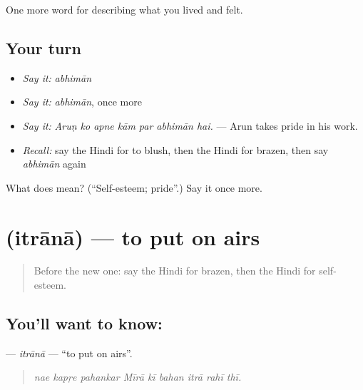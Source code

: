 \begin{grammarlens}[title={What you've built}]
One more word for describing what you lived and felt.
\end{grammarlens}

\subsection*{Your turn}
\begin{itemize}
\raggedright
  \item \emph{Say it:} \emph{abhimān}
  \item \emph{Say it:} \emph{abhimān}, once more
  \item \emph{Say it:} \emph{Aruṇ ko apne kām par abhimān hai.} — Arun takes pride in his work.
  \item \emph{Recall:} say the Hindi for to blush, then the Hindi for brazen, then say \emph{abhimān} again
\end{itemize}

\begin{tcolorbox}[breakable,colback=teal!4,colframe=teal!35!black,title={Before you move on}]
What does  mean? (\textquotedblleft{}Self-esteem; pride\textquotedblright{}.) Say it once more.
\end{tcolorbox}
\section[\texorpdfstring{\hi{इतराना} (itrānā)}{इतराना (itrānā)}]{ (itrānā) — to put on airs}

\label{lesson:HI-C462-itrana}



\begin{quote}
Before the new one: say the Hindi for brazen, then the Hindi for self-esteem.
\end{quote}

\subsection*{You'll want to know: }
\textbf{} — \emph{itrānā} — \textquotedblleft{}to put on airs\textquotedblright{}.

\begin{quote}
        
\end{quote}

\begin{quote}
\emph{nae kapṛe pahankar Mīrā kī bahan itrā rahī thī.}
\end{quote}


